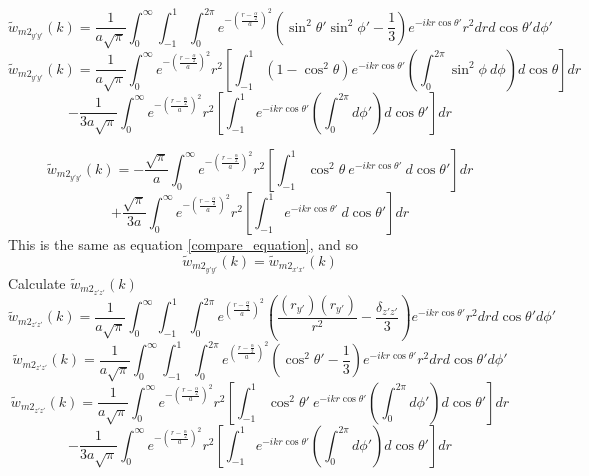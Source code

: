 \documentclass[12pt]{article}
\begin{document}
\begin{equation}{\widetilde{w}_{{m2}_{y'y'}}(k)=\frac{1}{a\sqrt{\pi}}\int_{0}^{\infty}\int_{-1}^{1}\int_{0}^{2\pi}e^{-\left(\frac{r-\frac{\alpha}{2}}{a}\right)^2}\left(\sin^2\theta'\sin^2\phi'-\frac{1}{3}\right)e^{-ikr\cos\theta'}r^2d{r}d{\cos\theta'}d{\phi'}}\end{equation}
\[{}\]
\begin{displaymath}{\widetilde{w}_{{m2}_{y'y'}}(k)=\frac{1}{a\sqrt{\pi}}\int_{0}^{\infty}e^{-\left(\frac{r-\frac{\alpha}{2}}{a}\right)^2}r^2\left[\int_{-1}^{1}\left(1-\cos^2\theta\right)e^{-ikr\cos\theta'}\left(\int_{0}^{2\pi}\sin^2\phi~d{\phi}\right)d{\cos\theta}\right]d{r}}\end{displaymath} 
\begin{equation}{-\frac{1}{3a\sqrt{\pi}}\int_{0}^{\infty}e^{-\left(\frac{r-\frac{\alpha}{2}}{a}\right)^2}r^2\left[\int_{-1}^{1}e^{-ikr\cos\theta'}\left(\int_{0}^{2\pi}d{\phi'}\right)d{\cos\theta'}\right]d{r}}\end{equation}

\color{blue}
\begin{displaymath}{\widetilde{w}_{{m2}_{y'y'}}(k)=-\frac{\sqrt{\pi}}{a}\int_{0}^{\infty}e^{-\left(\frac{r-\frac{\alpha}{2}}{a}\right)^2}r^2\left[\int_{-1}^{1}\cos^2\theta~e^{-ikr\cos\theta'}~d{\cos\theta'}\right]d{r}}\end{displaymath} 
\begin{equation}{+\frac{\sqrt{\pi}}{3a}\int_{0}^{\infty}e^{-\left(\frac{r-\frac{\alpha}{2}}{a}\right)^2}r^2\left[\int_{-1}^{1}e^{-ikr\cos\theta'}~d{\cos\theta'}\right]d{r}}\end{equation}
\color{black} 
\[{}\]
This is the same as equation \ref{compare_equation}, and so \begin{equation}{\widetilde{w}_{{m2}_{y'y'}}(k)=\widetilde{w}_{{m2}_{x'x'}}(k)}\end{equation}
Calculate $\widetilde{w}_{{m2}_{z'z'}}(k)$ 
\begin{equation}{\widetilde{w}_{{m2}_{z'z'}}(k)=\frac{1}{a\sqrt{\pi}}\int_{0}^{\infty}\int_{-1}^{1}\int_{0}^{2\pi}e^{\left(\frac{r-\frac{\alpha}{2}}{a}\right)^2}\left(\frac{(r_{y'})(r_{y'})}{r^2}-\frac{\delta_{z'z'}}{3}\right)e^{-ikr\cos\theta'}r^2d{r}d{\cos\theta'}d{\phi'}}\end{equation}
\begin{equation}{\widetilde{w}_{{m2}_{z'z'}}(k)=\frac{1}{a\sqrt{\pi}}\int_{0}^{\infty}\int_{-1}^{1}\int_{0}^{2\pi}e^{\left(\frac{r-\frac{\alpha}{2}}{a}\right)^2}\left(\cos^2\theta'-\frac{1}{3}\right)e^{-ikr\cos\theta'}r^2d{r}d{\cos\theta'}d{\phi'}}\end{equation}
\[{}\]
\begin{displaymath}{\widetilde{w}_{{m2}_{z'z'}}(k)=\frac{1}{a\sqrt{\pi}}\int_{0}^{\infty}e^{-\left(\frac{r-\frac{\alpha}{2}}{a}\right)^2}r^2\left[\int_{-1}^{1}\cos^2\theta'~e^{-ikr\cos\theta'}\left(\int_{0}^{2\pi}d{\phi'}\right)d{\cos\theta'}\right]d{r}}\end{displaymath} 
\begin{equation}{-\frac{1}{3a\sqrt{\pi}}\int_{0}^{\infty}e^{-\left(\frac{r-\frac{\alpha}{2}}{a}\right)^2}r^2\left[\int_{-1}^{1}e^{-ikr\cos\theta'}\left(\int_{0}^{2\pi}d{\phi'}\right)d{\cos\theta'}\right]d{r}}\end{equation}
\end{document}
